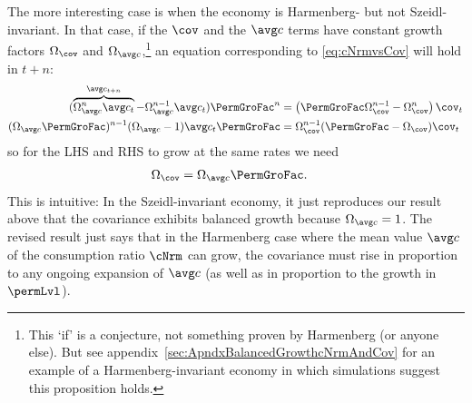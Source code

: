 \documentclass[\econtexRoot/BufferStockTheory]{subfiles}
\begin{document}
The more interesting case is when the economy is Harmenberg- but not Szeidl-invariant.
In that case, if the $\cov$ and the $\cNrmAvg$ terms have constant growth factors $\GroFac_{\cov}$ and $\GroFac_{\cNrmAvg}$,\footnote{This `if' is a conjecture, not something proven by Harmenberg (or anyone else).
But see appendix~\ref{sec:ApndxBalancedGrowthcNrmAndCov} for an example of a Harmenberg-invariant economy in which simulations suggest this proposition holds.} an equation corresponding to \eqref{eq:cNrmvsCov} will hold in $t+n$:
\begin{equation} \label{eq:aNrmGrovsCovGronm1}
  \begin{aligned}
    (\overbrace{\GroFac_{\cNrmAvg}^{n}\cNrmAvg_{t}}^{\cNrmAvg_{t+n}}-\GroFac^{n-1}_{\cNrmAvg}\cNrmAvg_{t})\PermGroFac^{n} & = \left(\PermGroFac\GroFac_{\cov}^{n-1} -\GroFac_{\cov}^{n}\right)\cov_{t}
    \\ (\GroFac_{\cNrmAvg}\PermGroFac)^{n-1} (\GroFac_{\cNrmAvg}-1)\cNrmAvg_{t}\PermGroFac & = \GroFac_{\cov}^{n-1}(\PermGroFac - \GroFac_{\cov}) \cov_{t}
  \end{aligned}
\end{equation}
so for the LHS and RHS to grow at the same rates we need
\begin{equation}\begin{gathered}\begin{aligned}
  \GroFac_{\cov}  & = \GroFac_{\cNrmAvg}\PermGroFac \label{eq:aNrmGrovscovGro}.
\end{aligned}\end{gathered}\end{equation}
This is intuitive:  In the Szeidl-invariant economy, it just reproduces our result above that the covariance exhibits balanced growth because $\GroFac_{\cNrmAvg}=1$.
The revised result just says that in the Harmenberg case where the mean value $\cNrmAvg$ of the consumption ratio $\cNrm$ can grow, the covariance must rise in proportion to any ongoing expansion of $\cNrmAvg$ (as well as in proportion to the growth in $\permLvl$).
\end{document}
